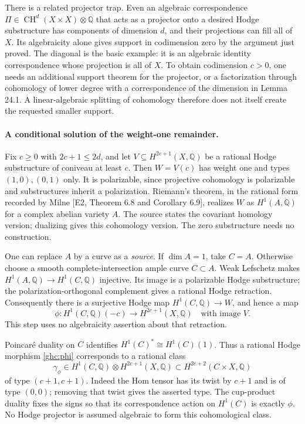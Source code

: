 \documentclass[11pt]{article}
\begin{document}
There is a related projector trap. Even an algebraic correspondence
 $\Pi\in\operatorname{CH}^{d}(X\times X)\otimes\mathbb Q$ that acts as
 a projector onto a desired Hodge substructure has components of dimension
 $d$, and their projections can fill all of $X$. Its algebraicity alone
 gives support in codimension zero by the argument just proved. The
 diagonal is the basic example: it is an algebraic identity correspondence
 whose projection is all of $X$. To obtain codimension $c>0$, one needs
 an additional support theorem for the projector, or a factorization
 through cohomology of lower degree with a correspondence of the dimension
 in Lemma 24.1. A linear-algebraic splitting of cohomology therefore does
 not itself create the requested smaller support.

\paragraph{A conditional solution of the weight-one remainder.}
Fix $c\geq0$ with $2c+1\leq2d$, and let
 $V\subseteq H^{2c+1}(X,\mathbb Q)$ be a rational Hodge substructure
 of coniveau at least $c$. Then $W=V(c)$ has weight one and types
 $(1,0),(0,1)$ only. It is polarizable, since projective cohomology is
 polarizable and substructures inherit a polarization. Riemann's theorem,
 in the rational form recorded by Milne [E2, Theorem 6.8 and Corollary 6.9],
 realizes $W$ as $H^1(A,\mathbb Q)$ for a complex abelian variety $A$.
 The source states the covariant homology version; dualizing gives this
 cohomology version. The zero substructure needs no construction.

One can replace $A$ by a curve as a \emph{source}. If $\dim A=1$, take
 $C=A$. Otherwise choose a smooth complete-intersection ample curve
 $C\subset A$. Weak Lefschetz makes
 $H^1(A,\mathbb Q)\to H^1(C,\mathbb Q)$ injective. Its image is a
 polarizable Hodge substructure; the polarization-orthogonal complement
 gives a rational Hodge retraction. Consequently there is a surjective
 Hodge map $H^1(C,\mathbb Q)\to W$, and hence a map
\begin{equation}\label{ghc:phi}
 \phi:H^1(C,\mathbb Q)(-c)\longrightarrow H^{2c+1}(X,\mathbb Q)
 \quad\text{with image }V.
\end{equation}
This step uses no algebraicity assertion about that retraction.

Poincar\'e duality on $C$ identifies
 $H^1(C)^*\cong H^1(C)(1)$. Thus a rational Hodge morphism
 \eqref{ghc:phi} corresponds to a rational class
\[
 \gamma_\phi\in H^1(C,\mathbb Q)\otimes H^{2c+1}(X,\mathbb Q)
       \subset H^{2c+2}(C\times X,\mathbb Q)
\]
 of type $(c+1,c+1)$. Indeed the Hom tensor has its twist by $c+1$
 and is of type $(0,0)$; removing that twist gives the asserted type.
 The cup-product duality fixes the signs so that its correspondence action
 on $H^1(C)$ is exactly $\phi$. No Hodge projector is assumed algebraic
 to form this cohomological class.
\end{document}
